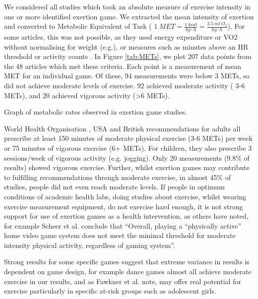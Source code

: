 We considered all studies which took an absolute measure of exercise intensity in one or more identified exertion game. We extracted the mean intensity of exertion and converted to Metabolic Equivalent of Task ( $1~MET= \frac{1~kcal}{ kg \cdot h} = \frac{3.5~ml~O_2}{ kg \cdot h}  $)\cite{jette1990metabolic}. For some  articles, this was not possible, as they used energy expenditure or VO2 without normalising for weight (e.g.\cite{Gribbon2015ActiveTrial}), or measures such as minutes above an HR threshold \cite{MacIntosh2017BalancingIii} or activity counts \cite{McDougall2008ChildrenStudy}. In Figure \ref{tab:METs}, we plot 207 data points from the 48 articles which met these criteria. Each point is a measurement of mean MET for an individual game. Of these, 94 measurements were below 3 METs, so did not achieve moderate levels of exercise. 92 achieved moderate activity ( 3-6 METs), and 20 achieved vigorous activity (\textgreater 6 METs).
  
\begin{table}
\setlength{\abovecaptionskip}{0pt}
\vspace{-4mm}
\caption{Graph of metabolic rates observed in exertion game studies.}

\label{tab:METs}
\end{table}

World Health Organisation \cite{world2010global}, USA \cite{usguidelines2018} and \cite{ukguidelines2011} British recommendations for adults all prescribe at least 150 minutes of moderate physical exercise (3-6 METs) per week or 75 minutes of vigorous exercise (6+ METs). For children, they also prescribe 3 sessions/week of vigorous activity (e.g. jogging). Only 20 measurements (9.8\% of results) showed vigorous exercise. Further, whilst exertion games may contribute to fulfilling recommendations through moderate exercise, in almost 45\% of studies, people did not even reach moderate levels. If people in optimum conditions of academic health labs, doing studies about exercise, whilst wearing exercise measurement equipment, do not exercise hard enough, it is not strong support for use of exertion games as a health intervention, as others have noted, for example Scheer et al. conclude that \enquote{Overall, playing a “physically active” home video game system does not meet the minimal threshold for moderate intensity physical activity, regardless of gaming system\cite{scheer2014wii}}. 

Strong results for some specific games suggest that extreme variance in results is dependent on game design, for example dance games almost all achieve moderate exercise in our results, and as Fawkner et al. \cite{Fawkner2010AdolescentGaming} note, may offer real potential for exercise particularly in specific at-risk groups such as adolescent girls. 

